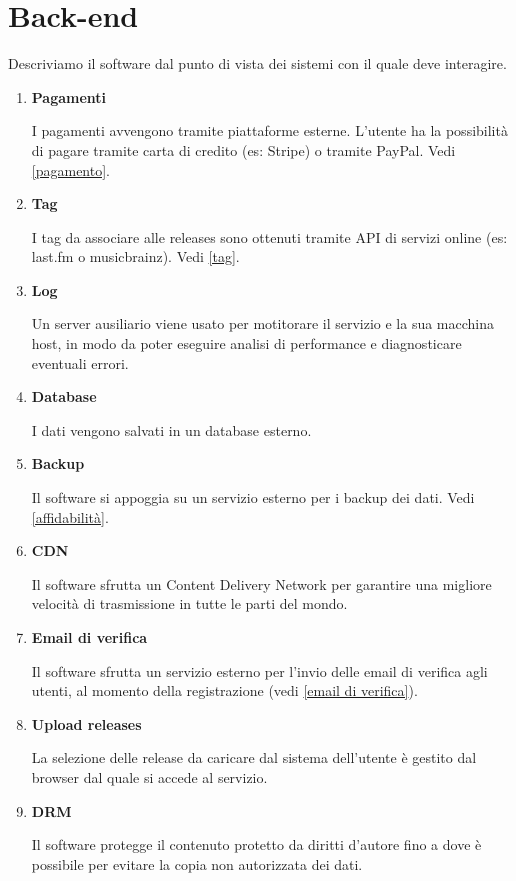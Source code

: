 \documentclass[a4paper,12pt]{article}
\begin{document}
\section{Back-end}

Descriviamo il software dal punto di vista dei sistemi con il quale deve interagire.

\begin{enumerate}[label=\textbf{BE\arabic*}\;, ref=\textbf{BE\arabic*}]
    \item \label{pagamento_backend} \textbf{Pagamenti}
    
    I pagamenti avvengono tramite piattaforme esterne. L'utente ha la possibilità di pagare tramite carta di credito (es: Stripe) o tramite PayPal. Vedi \ref{pagamento}.
    \item \label{tag backend} \textbf{Tag}
    
    I tag da associare alle releases sono ottenuti tramite API di servizi online (es: last.fm o musicbrainz). Vedi \ref{tag}.
    \item \label{log} \textbf{Log}
    
    Un server ausiliario viene usato per motitorare il servizio e la sua macchina host, in modo da poter eseguire analisi di performance e diagnosticare eventuali errori.
    \item \label{database} \textbf{Database}
    
    I dati vengono salvati in un database esterno.
    \item \label{backup} \textbf{Backup}
    
    Il software si appoggia su un servizio esterno per i backup dei dati. Vedi \ref{affidabilità}.
    \item \label{CDN} \textbf{CDN}
    
    Il software sfrutta un Content Delivery Network per garantire una migliore velocità di trasmissione in tutte le parti del mondo.
    \item \label{backend email di verifica} \textbf{Email di verifica}
    
    Il software sfrutta un servizio esterno per l'invio delle email di verifica agli utenti, al momento della registrazione (vedi \ref{email di verifica}).
    \item \label{upload releases} \textbf{Upload releases}
    
    La selezione delle release da caricare dal sistema dell'utente è gestito dal browser dal quale si accede al servizio.
    \item \label{sistema DRM} \textbf{DRM}
    
    Il software protegge il contenuto protetto da diritti d’autore fino a dove è possibile per evitare la copia non autorizzata dei dati.
\end{enumerate}
\end{document}
